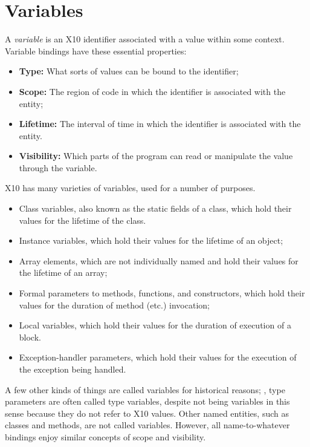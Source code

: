 
\chapter{Variables}\label{XtenVariables}


A {\em variable} is an X10 identifier associated with a value within some
context. Variable bindings have these essential properties:
\begin{itemize}
\item {\bf Type:} What sorts of values can be bound to the identifier;
\item {\bf Scope:} The region of code in which the identifier is associated
      with the entity;
\item {\bf Lifetime:} The interval of time in which the identifier is
      associated with the entity.
\item {\bf Visibility:} Which parts of the program can read or manipulate the
      value through the variable.
\end{itemize}



X10 has many varieties of variables, used for a number of purposes. 
\begin{itemize}
\item Class variables, also known as the static fields of a class, which hold
      their values for the lifetime of the class.  
\item Instance variables, which hold their values for the lifetime of an
      object;
\item Array elements, which are not individually named and hold their values
      for the lifetime of an array;
\item Formal parameters to methods, functions, and constructors, which hold
      their values for the duration of method (etc.) invocation;
\item Local variables, which hold their values for the duration of execution
      of a block.
\item Exception-handler parameters, which hold their values for the execution
      of the exception being handled. 
\end{itemize}
A few other kinds of things are called variables for historical reasons; \eg,
type parameters are often called type variables, despite not being variables
in this sense because they do not refer to X10 values.  Other named entities,
such as classes and methods, are not called variables.  However, all
name-to-whatever bindings enjoy similar concepts of scope and visibility.  

